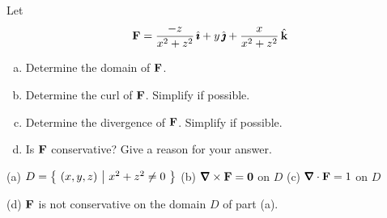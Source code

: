 \begin{question}[M317 2006D] %
Let
\begin{align*}
\mathbf{F} = \frac{-z}{x^2+z^2}\,\hat{\pmb{\imath}} +y\,\hat{\pmb{\jmath}} +\frac{x}{x^2+z^2}\,\hat{\mathbf{k}}
\end{align*}

\begin{enumerate}[(a)]
\item
Determine the domain of $\mathbf{F}$.
\item
Determine the curl of $\mathbf{F}$. Simplify if possible.
\item
Determine the divergence of $\mathbf{F}$. Simplify if possible.
\item
Is $\mathbf{F}$ conservative? Give a reason for your answer.
\end{enumerate}
\end{question}

%

\begin{answer} 
(a) $D=\big\{ \ (x,y,z)\ \big|\ x^2+z^2\ne 0\ \big\}$\qquad
(b) $\vnabla\times\vF=\vZero$ on $D$\qquad
(c) $\vnabla\cdot\vF=1$ on $D$

(d) $\mathbf{F}$ is not conservative on the domain $D$ of part (a).

\end{answer}

